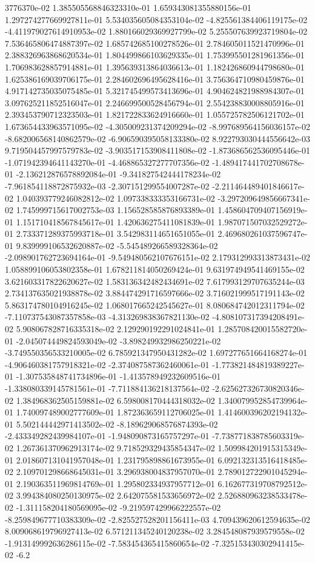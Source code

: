 3776370e-02	1.385505568846323310e-01	1.659343081355880156e-01	1.297274277669927811e-01	5.534035605084353104e-02	-4.825561384406119175e-02	-4.411979027614910953e-02	1.880166029369927799e-02	5.255507639923719804e-02	7.536465806474887397e-02	1.685742685100278526e-01	2.784605011521470996e-01	2.388326963868620534e-01	1.804499866103629335e-01	1.753995501281961356e-01	1.706983628857914881e-01	1.395639313864036613e-01	1.182426860944798680e-01	1.625386169039706175e-01	2.284602696495628416e-01	3.756364710980459876e-01	4.917142735035075485e-01	5.321745499573413696e-01	4.904624821988984307e-01	3.097625211852516047e-01	2.246699500528456794e-01	2.554238830008805916e-01	2.393453790712323503e-01	1.821722833624916660e-01	1.055725782506121702e-01	1.673654433963571095e-02	-4.305009231374209294e-02	-8.997689564156036157e-02	-8.682006568140862579e-02	-6.906590395058133380e-02	8.922793030444556642e-03	9.719504457997579783e-02	-3.903517153908411808e-02	-1.873686562536095446e-01	-1.071942394641143270e-01	-4.468865327277707356e-02	-1.489417441702708678e-01	-2.136212876578892084e-01	-9.341827542444178234e-02	-7.961854118872875932e-03	-2.307151299554007287e-02	-2.211464489401846617e-02	1.040393779246082812e-02	1.097338333353166731e-02	-3.297209649856667341e-02	1.745999715617002753e-03	1.156528585876893389e-01	1.458604709407156919e-01	1.151710418567845617e-01	1.420636275411081839e-01	1.987071507032529272e-01	2.733371289375993718e-01	3.542983114651651055e-01	2.469680261037596747e-01	9.839999106532620887e-02	-5.545489266589328364e-02	-2.098901762723694164e-01	-9.549480562107676151e-02	2.179312993313873431e-02	1.058899106053802358e-01	1.678211814050269424e-01	9.631974949541469155e-02	3.621603317822620627e-02	1.583136342482434691e-02	7.617993129707635244e-03	2.734137635021938878e-02	3.884474291716597666e-02	3.716021999517191143e-02	5.863174780104916245e-02	1.068017665242545627e-01	8.080684742012311794e-02	-7.110737543087357858e-03	-4.313269838367821130e-02	-4.808107317394208491e-02	5.908067828716335318e-02	2.129290192291024841e-01	1.285708420015582720e-01	-2.045074449824593049e-02	-3.898249932986250221e-02	-3.749550356533210005e-02	6.785921347950431282e-02	1.697277651664168274e-01	-4.906460381757918321e-02	-2.374087587362460061e-01	-1.773821484819389227e-01	-1.307535848741734896e-01	-1.413578949232609516e-01	-1.338080339145781561e-01	-7.711884136218137564e-02	-2.625627326730820346e-02	1.384968362505159881e-02	6.598008170444318032e-02	1.340079952854739964e-01	1.740097489002777609e-01	1.872363659112706025e-01	1.414600396202194132e-01	5.502144442971413502e-02	-8.189629068576874393e-02	-2.433349282439984107e-01	-1.948090873165757297e-01	-7.738771838785603319e-02	1.267361370962913174e-02	9.718529329435854347e-02	1.509984201915315349e-01	2.018607131041957048e-01	1.231795898861673955e-01	6.092132313516418485e-02	2.109701298668645031e-01	3.296938004837957070e-01	2.789012722901045294e-01	2.190363511969814769e-01	1.295802334937957712e-01	6.162677319708792512e-02	3.994384080250130975e-02	2.642075581533656972e-02	2.526880963238533478e-02	-1.311158204180569095e-02	-9.219597429966222557e-02	-8.259849677710383309e-02	-2.825527528201156411e-03	4.709439620612594635e-02	8.009068619796927413e-02	6.571211345240120238e-02	3.284548087939579558e-02	-1.913149992636286115e-02	-7.583454365415860654e-02	-7.325153430302941415e-02	-6.2